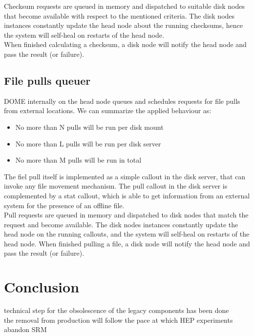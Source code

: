 \documentclass[a4paper]{jpconf}
\begin{document}
 Checksum requests are queued in memory and dispatched to suitable disk nodes that become available with respect to the mentioned criteria. The disk nodes instances
 constantly update the head node about the running checksums, hence the system will self-heal on restarts of the head node.\\
 When finished calculating a checksum, a disk node will notify the head node and pass the result (or failure).\\
 
\subsection{File pulls queuer}
DOME internally on the head node queues and schedules requests for file pulls from external locations. We can summarize the applied behaviour as:
 \begin{itemize}
  \item No more than N pulls will be run per disk mount\\
  \item No more than L pulls will be run per disk server\\
  \item No more than M pulls will be run in total\\
 \end{itemize}
 
The fiel pull itself is implemented as a simple callout in the disk server, that can invoke any file movement mechanism.
The pull callout in the disk server is complemented by a stat callout, which is able to get information from
an external system for the presence of an offline file.\\

Pull requests are queued in memory and dispatched to disk nodes that match the request and become available.
The disk nodes instances constantly update the head node on the running callouts, and the system will self-heal
on restarts of the head node. When finished pulling a file, a disk node will notify the head node and pass the result (or failure).\\

\section{Conclusion}

technical step for the obsolescence of the legacy components has been done\\
the removal from production will follow the pace at which HEP experiments abandon SRM\\
\end{document}
